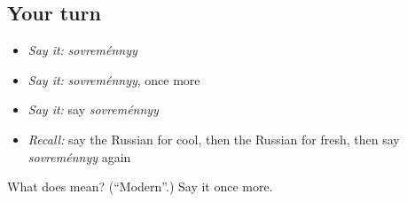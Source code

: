 \subsection*{Your turn}
\begin{itemize}
\raggedright
  \item \emph{Say it:} \emph{sovreménnyy}
  \item \emph{Say it:} \emph{sovreménnyy}, once more
  \item \emph{Say it:} say \emph{sovreménnyy}
  \item \emph{Recall:} say the Russian for cool, then the Russian for fresh, then say \emph{sovreménnyy} again
\end{itemize}

\begin{tcolorbox}[breakable,colback=teal!4,colframe=teal!35!black,title={Before you move on}]
What does  mean? (\textquotedblleft{}Modern\textquotedblright{}.) Say it once more.
\end{tcolorbox}
